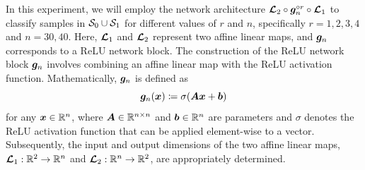 \documentclass[nohyperref]{article}
\theoremstyle{plain}
\theoremstyle{definition}
\theoremstyle{remark}
\begin{document}
In this experiment, we will employ the network architecture ${\bm{\mathcal{L}}}_2\circ{\bm{g}}_n^{\circ r}\circ{\bm{\mathcal{L}}}_1$ to classify samples in ${\mathcal{S}}_0\cup {\mathcal{S}}_1$ for different values of $r$ and $n$, specifically $r=1,2,3,4$ and $n=30,40$. 
Here, ${\bm{\mathcal{L}}}_1$ and ${\bm{\mathcal{L}}}_2$ represent two affine linear maps, and ${\bm{g}}_n$ corresponds to a ReLU network block. 
The construction of the ReLU network block ${\bm{g}}_n$ involves combining an affine linear map with the ReLU activation function.
Mathematically, ${\bm{g}}_n$ is defined as
\begin{equation*}   
    {\bm{g}}_n({\bm{x}})\coloneqq\sigma(\bm{A} {\bm{x}}+{\bm{b}})
\end{equation*}
for any $\bmx\in\R^{n}$, where $\bmA\in\R^{n\times n}$ and $\bmb\in\R^{n}$ are parameters and $\sigma$ 
denotes the ReLU activation function that can be applied element-wise to a vector.
Subsequently, the input and output dimensions of the two affine linear maps, ${\bm{\mathcal{L}}}_1:\mathbb{R}^2\rightarrow\mathbb{R}^{n}$ and ${\bm{\mathcal{L}}}_2:\mathbb{R}^{n}\rightarrow\mathbb{R}^2$, are appropriately determined. 
\end{document}

